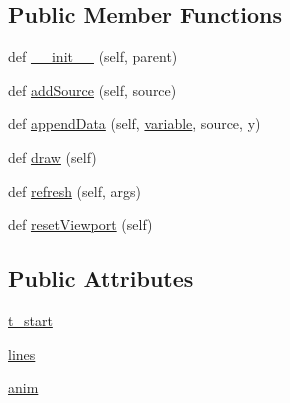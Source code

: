 \subsection*{Public Member Functions}
\begin{DoxyCompactItemize}
\item 
def \mbox{\hyperlink{classwindshape_1_1gui_1_1widgets_1_1plots_1_1_real_time_plot_widget_1_1_real_time_plot_widget_a2709f2b7482161f7d965ea04c8e0ba6d}{\+\_\+\+\_\+init\+\_\+\+\_\+}} (self, parent)
\item 
def \mbox{\hyperlink{classwindshape_1_1gui_1_1widgets_1_1plots_1_1_real_time_plot_widget_1_1_real_time_plot_widget_a5d037e52b4db09c9f67653b1040e21b3}{add\+Source}} (self, source)
\item 
def \mbox{\hyperlink{classwindshape_1_1gui_1_1widgets_1_1plots_1_1_real_time_plot_widget_1_1_real_time_plot_widget_aa0a1266b8255059c461bd7b408c59fa7}{append\+Data}} (self, \mbox{\hyperlink{classwindshape_1_1gui_1_1widgets_1_1plots_1_1_plot_widget_1_1_plot_widget_a740aa3698f6d10d8b3d352d69f890a7d}{variable}}, source, y)
\item 
def \mbox{\hyperlink{classwindshape_1_1gui_1_1widgets_1_1plots_1_1_real_time_plot_widget_1_1_real_time_plot_widget_a54540d81741ada081f938e526e3daa23}{draw}} (self)
\item 
def \mbox{\hyperlink{classwindshape_1_1gui_1_1widgets_1_1plots_1_1_real_time_plot_widget_1_1_real_time_plot_widget_a6da1feb72934f37c992998e8367a3dd7}{refresh}} (self, args)
\item 
def \mbox{\hyperlink{classwindshape_1_1gui_1_1widgets_1_1plots_1_1_real_time_plot_widget_1_1_real_time_plot_widget_ab10e24b676c557fba831c0eec65c104c}{reset\+Viewport}} (self)
\end{DoxyCompactItemize}
\subsection*{Public Attributes}
\begin{DoxyCompactItemize}
\item 
\mbox{\hyperlink{classwindshape_1_1gui_1_1widgets_1_1plots_1_1_real_time_plot_widget_1_1_real_time_plot_widget_ac4808d14dafac55bf240df7ef6f0b1f7}{t\+\_\+start}}
\item 
\mbox{\hyperlink{classwindshape_1_1gui_1_1widgets_1_1plots_1_1_real_time_plot_widget_1_1_real_time_plot_widget_a329d03a9c22511ee862cb0c157451ad8}{lines}}
\item 
\mbox{\hyperlink{classwindshape_1_1gui_1_1widgets_1_1plots_1_1_real_time_plot_widget_1_1_real_time_plot_widget_a68251d5388e449d21ece901bd9630e94}{anim}}
\end{DoxyCompactItemize}
